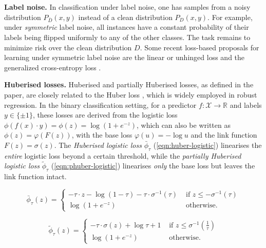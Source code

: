 \textbf{Label noise.} In classification under label noise, one has samples from a noisy distribution $P_{\bar{D}}(x,y)$ instead of a clean distribution $P_{D}(x,y)$. For example, under \emph{symmetric} label noise, all instances have a constant probability of their labels being flipped uniformly to any of the other classes. 
The task remains to minimize risk over the clean distribution $D$.
Some recent loss-based proposals for learning under symmetric label noise are the linear or unhinged loss \citep{van_rooyen_learning_2015} and the generalized cross-entropy loss \citep{zhang_generalized_2018}.

\textbf{Huberised losses.} Huberised and partially Huberised losses, as defined in the paper, are closely related to the Huber loss \citep{huber_robust_1964}, which is widely employed in robust regression. In the binary classification setting, for a predictor $f : \mathcal{X} \rightarrow \mathbb{R}$ and labels $y \in \{\pm1\}$, these losses are derived from the logistic loss $ \phi(f(x) \cdot y) = \phi(z)=\log(1 + e^{-z})$, which can also be written as $\phi(z)=\varphi(F(z))$, with the base loss $\varphi(u)=-\log u$ and the link function $F(z)=\sigma(z)$. The \emph{Huberised logistic loss} $\bar{\phi}_{\tau}$ (\autoref{eqn:huber-logistic}) linearises the \emph{entire} logistic loss beyond a certain threshold, while the \emph{partially Huberised logistic loss} $\tilde{\phi}_{\tau}$ (\autoref{eqn:phuber-logistic}) linearises \emph{only} the base loss but leaves the link function intact.

\begin{equation}
\label{eqn:huber-logistic}
\bar{\phi}_{\tau}(z)=\left\{\begin{array}{ll}
-\tau \cdot z-\log (1-\tau)-\tau \cdot \sigma^{-1}(\tau) & \text { if } z \leq-\sigma^{-1}(\tau) \\
\log \left(1+e^{-z}\right) & \text { otherwise. }
\end{array}\right.
\end{equation}

\begin{equation}
\label{eqn:phuber-logistic}
\tilde{\phi}_{\tau}(z)=\left\{\begin{array}{ll}
-\tau \cdot \sigma(z)+\log \tau+1 & \text { if } z \leq \sigma^{-1}\left(\frac{1}{\tau}\right) \\
\log \left(1+e^{-z}\right) & \text { otherwise. }
\end{array}\right.
\end{equation}

